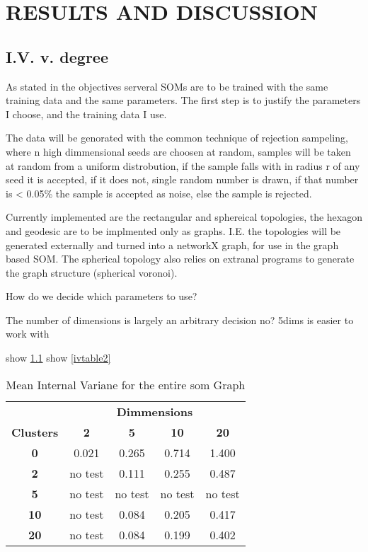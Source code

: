 \chapter{RESULTS AND DISCUSSION}



\section{I.V. v. degree}

As stated in the objectives serveral SOMs are to be trained with the same
training data and the same parameters.  The first step is to justify the
parameters I choose, and the training data I use.

The data will be genorated with the common technique of rejection sampeling,
where n high dimmensional seeds are choosen at random, samples will be taken
at random from a uniform distrobution, if the sample falls with in radius r of
any seed it is accepted, if it does not, single random number is drawn, if that
number is < 0.05\% the sample is accepted as noise, else the sample is rejected.

Currently implemented are the rectangular and sphereical topologies, the hexagon
and geodesic are to be implmented only as graphs.  I.E. the topologies will be
generated externally and turned into a networkX graph, for use in the graph
based SOM. The spherical topology also relies on extranal programs to generate
the graph structure (spherical voronoi).

How do we decide which parameters to use?

The number of dimensions is largely an arbitrary decision no?
5dims is easier to work with

show \ref{ivtable1}
show \ref{ivtable2}

\begin{table}
\caption{Mean Internal Variane for the entire som Graph}
\label{ivtable1}
\begin{tabular}{|c||c|c|c|c|}
\hline
&\multicolumn{4}{c|}{\textbf{Dimmensions}}\\
\textbf{Clusters} & \multicolumn{1}{c}{\textbf{2}} &
\multicolumn{1}{c}{\textbf{5}} & \multicolumn{1}{c}{\textbf{10}} &
\multicolumn{1}{c|}{\textbf{20}}\\
\hline
\hline
\textbf{0} & 0.021& 0.265& 0.714& 1.400 \\
\hline
\textbf{2} & no test& 0.111& 0.255& 0.487 \\
\hline
\textbf{5} & no test& no test& no test& no test \\
\hline
\textbf{10} & no test& 0.084& 0.205& 0.417 \\
\hline
\textbf{20} & no test& 0.084& 0.199& 0.402 \\
\hline
\end{tabular} \end{table}



